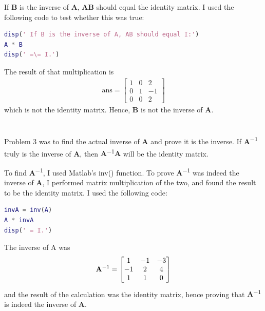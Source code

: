 \documentclass{article}
\begin{document}
If \textbf{B} is the inverse of \textbf{A}, \textbf{AB} should equal the identity matrix.  I used the following code to test whether this was true:

\begin{lstlisting}[language=Matlab]
% Show by multiplication that B is not the inverse of A.
disp(' If B is the inverse of A, AB should equal I:')
A * B 
disp(' =\= I.')
\end{lstlisting}

The result of that multiplication is
\begin{align*}
    \text{ans} = \begin{bmatrix}
    1 & 0 & 2\\
    0 & 1 & -1\\
    0 & 0 & 2
    \end{bmatrix}
\end{align*}
which is not the identity matrix.  Hence, \textbf{B} is not the inverse of \textbf{A}.

\section{}

Problem 3 was to find the actual inverse of \textbf{A} and prove it is the inverse.
If \textbf{A\textsuperscript{$-1$}} truly is the inverse of \textbf{A}, then \textbf{A\textsuperscript{$-1$}A} will be the identity matrix.

To find \textbf{A\textsuperscript{$-1$}}, I used Matlab's inv() function.  To prove \textbf{A\textsuperscript{$-1$}} was indeed the inverse of \textbf{A}, I performed matrix multiplication of the two, and found the result to be the identity matrix.  I used the following code:

\begin{lstlisting}[language=Matlab]
% Find the actual inverse of A and prove it is the inverse.
invA = inv(A)
A * invA 
disp(' = I.')
\end{lstlisting}

The inverse of A was
\begin{align*}
    \textbf{A\textsuperscript{$-1$}} = \begin{bmatrix}
    1 & -1 & -3\\
    -1 & 2 & 4\\
    1 & 1 & 0
    \end{bmatrix}
\end{align*}
and the result of the calculation was the identity matrix, hence proving that \textbf{A\textsuperscript{$-1$}} is indeed the inverse of \textbf{A}.
\end{document}
